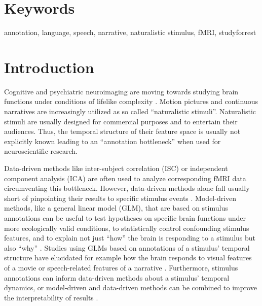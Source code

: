 \documentclass[10pt,a4paper,onecolumn]{article}
\begin{document}
\section*{Keywords}
annotation, language, speech, narrative, naturalistic stimulus, fMRI, studyforrest

\listoftodos

\clearpage


\section*{Introduction}
Cognitive and psychiatric neuroimaging are moving towards studying brain
functions under conditions of lifelike complexity
\citep{sonkusare2019naturalistic, eickhoff2020towards}. Motion pictures
\citep{hasson2008neurocinematics} and continuous narratives
\citep{wilson2008beyond, lerner2011topographic} are increasingly utilized as so called ``naturalistic
stimuli''.
Naturalistic stimuli are usually designed for commercial purposes and to
entertain their audiences.
Thus, the temporal structure of their feature space is usually not explicitly
known leading to an ``annotation bottleneck'' \citep{aliko2020naturalistic} when
used for neuroscientific research.

Data-driven methods like inter-subject correlation
(ISC)\citep{hasson2004intersubject} or independent component analysis
(ICA)\citep{bartels2004chronoarchitecture} are often used to analyze
corresponding fMRI data circumventing this bottleneck.
However, data-driven methods alone fall usually short of pinpointing their
results to specific stimulus events \citep{kauttonen2015optimizing}.
Model-driven methods, like a general linear model (GLM), that are based on
stimulus annotations can be useful to test hypotheses on specific brain
functions under more ecologically valid conditions, to statistically control
confounding stimulus features, and to explain not just ``how'' the brain is
responding to a stimulus but also ``why'' \citep{hamilton2018revolution}.
Studies using GLMs based on annotations of a stimulus' temporal structure have
elucidated for example how the brain responds to visual features of a movie
\citep{bartels2004mapping} or speech-related features of a narrative
\citep{rocca2020language}.
Furthermore, stimulus annotations can inform data-driven methods about a
stimulus' temporal dynamics, or model-driven and data-driven methods can be
combined to improve the interpretability of results \citep{lahnakoski2012stimulus}.
\end{document}
